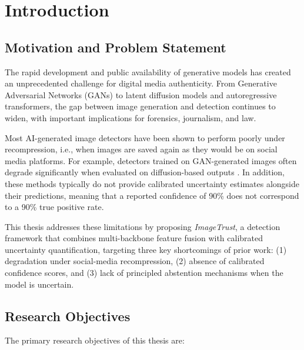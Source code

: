 
\chapter{Introduction}\label{chap:intro}

\section{Motivation and Problem Statement}\label{sec:motivation}

The rapid development and public availability of generative models has created an unprecedented challenge for digital media authenticity. From Generative Adversarial Networks (GANs) \cite{goodfellow2014generative} to latent diffusion models \cite{rombach2022high} and autoregressive transformers, the gap between image generation and detection continues to widen, with important implications for forensics, journalism, and law.

Most AI-generated image detectors have been shown to perform poorly under recompression, i.e., when images are saved again as they would be on social media platforms. For example, detectors trained on GAN-generated images often degrade significantly when evaluated on diffusion-based outputs \cite{corvi2023detection}. In addition, these methods typically do not provide calibrated uncertainty estimates alongside their predictions, meaning that a reported confidence of 90\% does not correspond to a 90\% true positive rate.

This thesis addresses these limitations by proposing \textit{ImageTrust}, a detection framework that combines multi-backbone feature fusion with calibrated uncertainty quantification, targeting three key shortcomings of prior work: (1) degradation under social-media recompression, (2) absence of calibrated confidence scores, and (3) lack of principled abstention mechanisms when the model is uncertain.


\section{Research Objectives}\label{sec:objectives}

The primary research objectives of this thesis are:

